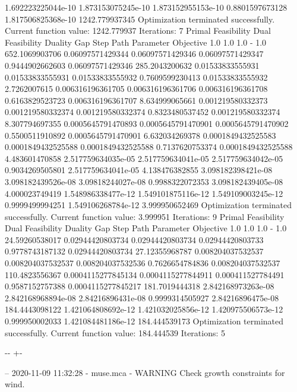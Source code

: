 \documentclass[letterpaper,10pt,english]{sphinxmanual}
\newlength\nbsphinxcodecellspacing
\begin{document}
{\begin{sphinxVerbatim}[commandchars=\\\{\}]
1.692223225044e-10  1.873153075245e-10  1.873152955153e-10  0.8801597673128  1.817506825368e-10  1242.779937345
Optimization terminated successfully.
         Current function value: 1242.779937
         Iterations: 7
Primal Feasibility  Dual Feasibility    Duality Gap         Step             Path Parameter      Objective
1.0                 1.0                 1.0                 -                1.0                 652.1069903706
0.06097571429344    0.06097571429346    0.06097571429347    0.9444902662603  0.06097571429346    285.2043200632
0.01533833555931    0.01533833555931    0.01533833555932    0.7609599230413  0.01533833555932    2.7262007615
0.006316196361705   0.006316196361706   0.006316196361708   0.6163829523723  0.006316196361707   8.634999065661
0.001219580332373   0.001219580332374   0.001219580332374   0.8323480537452  0.001219580332374   8.307794697355
0.0005645791470893  0.0005645791470901  0.0005645791470902  0.5500511910892  0.0005645791470901  6.632034269378
0.0001849432525583  0.0001849432525588  0.0001849432525588  0.7137620753374  0.0001849432525588  4.483601470858
2.517759634035e-05  2.517759634041e-05  2.517759634042e-05  0.9034269505801  2.517759634041e-05  4.138476382855
3.098182398421e-08  3.098182439526e-08  3.09818244027e-08   0.9988322072353  3.098182439405e-08  4.000023749419
1.548986338477e-12  1.549101875116e-12  1.549109003245e-12  0.9999499994251  1.549106268784e-12  3.999950652469
Optimization terminated successfully.
         Current function value: 3.999951
         Iterations: 9
Primal Feasibility  Dual Feasibility    Duality Gap         Step             Path Parameter      Objective
1.0                 1.0                 1.0                 -                1.0                 24.59260538017
0.02944420803734    0.02944420803734    0.02944420803733    0.9778743187132  0.02944420803734    27.12355968787
0.008204037532537   0.008204037532537   0.008204037532536   0.7626654784836  0.008204037532537   110.4823556367
0.0004115277845134  0.0004115277844911  0.000411527784491   0.9587152757388  0.0004115277845217  181.7019444318
2.842168973263e-08  2.842168968894e-08  2.84216896431e-08   0.9999314505927  2.84216896475e-08   184.4443098122
1.421064808692e-12  1.421032025856e-12  1.420975506573e-12  0.999950002033   1.421084481186e-12  184.444539173
Optimization terminated successfully.
         Current function value: 184.444539
         Iterations: 5
\end{sphinxVerbatim}
}

{

\kern-\sphinxverbatimsmallskipamount\kern-\baselineskip
\kern+\FrameHeightAdjust\kern-\fboxrule
\vspace{\nbsphinxcodecellspacing}

\begin{sphinxVerbatim}[commandchars=\\\{\}]
-- 2020-11-09 11:32:28 - muse.mca - WARNING
Check growth constraints for wind.

\end{sphinxVerbatim}
}
\end{document}

